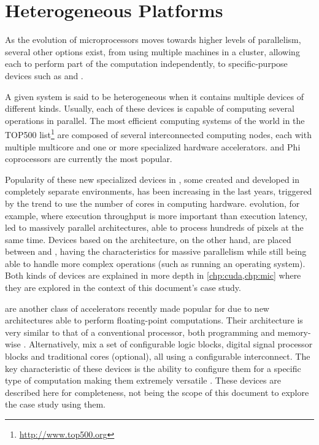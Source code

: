 \documentclass[../thesis]{subfiles}
\begin{document}
	\section{Heterogeneous Platforms}
	\label{sec:techbg:hetplats}

	As the evolution of microprocessors moves towards higher levels of parallelism, several other options exist, from using multiple machines in a cluster, allowing each to perform part of the computation independently, to specific-purpose devices such as \dsps and \gpus.

	A given system is said to be heterogeneous when it contains multiple devices of different kinds. Usually, each of these devices is capable of computing several operations in parallel. The most efficient computing systems of the world in the TOP500 list\footnote{\url{http://www.top500.org}} are composed of several interconnected computing nodes, each with multiple multicore \cpus and one or more specialized hardware accelerators. \gpus and \intel\xeon Phi coprocessors are currently the most popular.

	Popularity of these new specialized devices in \hpc, some created and developed in completely separate environments, has been increasing in the last years, triggered by the trend to use the number of cores in computing hardware. \gpus evolution, for example, where execution throughput is more important than execution latency, led to massively parallel architectures, able to process hundreds of pixels at the same time. Devices based on the \intel\mic architecture, on the other hand, are placed between \gpus and \cpus, having the characteristics for massive parallelism while still being able to handle more complex operations (such as running an operating system). Both kinds of devices are explained in more depth in \cref{chp:cuda,chp:mic} where they are explored in the context of this document's case study.

	\dsps are another class of accelerators recently made popular for \hpc due to new architectures able to perform floating-point computations. Their architecture is very similar to that of a conventional processor, both programming and memory-wise \cite{FLAWN61}. Alternatively, \fpgas mix a set of configurable logic blocks, digital signal processor blocks and traditional \cpu cores (optional), all using a configurable interconnect. The key characteristic of these devices is the ability to configure them for a specific type of computation making them extremely versatile \cite{Brodtkorb:2010}. These devices are described here for completeness, not being the scope of this document to explore the case study using them.
\end{document}
